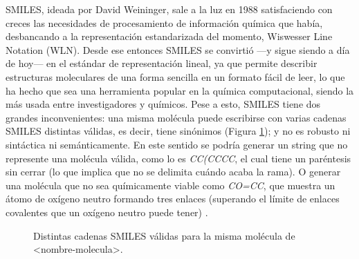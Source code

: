 SMILES, ideada por David Weininger, sale a la luz en 1988 satisfaciendo con creces las necesidades de procesamiento de información química que había, desbancando a la representación estandarizada del momento, Wiswesser Line Notation (WLN). Desde ese entonces SMILES se convirtió —y sigue siendo a día de hoy— en el estándar de representación lineal, ya que permite describir estructuras moleculares de una forma sencilla en un formato fácil de leer, lo que ha hecho que sea una herramienta popular en la química computacional, siendo la más usada entre investigadores y químicos. Pese a esto, SMILES tiene dos grandes inconvenientes: una misma molécula puede escribirse con varias cadenas SMILES distintas válidas, es decir, tiene sinónimos (Figura \ref{fig:sinonimos_smiles}); y no es robusto ni sintáctica ni semánticamente. En este sentido se podría generar un string que no represente una molécula válida, como lo es \emph{CC(CCCC}, el cual tiene un paréntesis sin cerrar (lo que implica que no se delimita cuándo acaba la rama). O generar una molécula que no sea químicamente viable como \emph{CO=CC}, que muestra un átomo de oxígeno neutro formando tres enlaces (superando el límite de enlaces covalentes que un oxígeno neutro puede tener) \cite{SELFIES}.

\begin{figure}[H]
\centering
    \caption{Distintas cadenas SMILES válidas para la misma molécula de <nombre-molecula>. \cite{}}
    \label{fig:sinonimos_smiles}
\end{figure}

